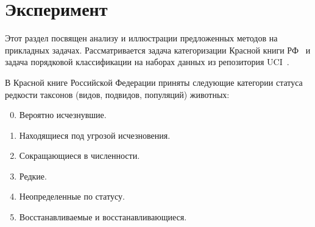 \documentclass{elsarticle}
\begin{document}

\section{Эксперимент}
Этот раздел посвящен анализу и иллюстрации предложенных методов на прикладных задачах. Рассматривается задача категоризации Красной книги РФ~\cite{stenina2015ordinal} и задача порядковой классификации на наборах данных из репозитория UCI~\cite{asuncion2007uci}.

В Красной книге Российской Федерации приняты следующие категории статуса редкости таксонов (видов, подвидов, популяций) животных:
\begin{enumerate}
\setcounter{enumi}{-1}
\item Вероятно исчезнувшие.
\item Находящиеся под угрозой исчезновения.
\item Сокращающиеся в численности.
\item Редкие.
\item Неопределенные по статусу.
\item Восстанавливаемые и восстанавливающиеся.
\end{enumerate}
\end{document}
